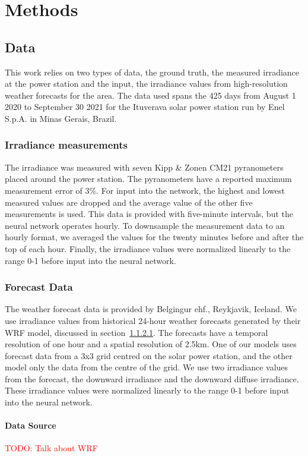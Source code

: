 \chapter{Methods}


\section{Data}
This work relies on two types of data, the ground truth, the measured irradiance at the power station and the input, the irradiance values from high-resolution weather forecasts for the area. The data used spans the 425 days from August 1 2020 to September 30 2021 for the Ituverava solar power station run by Enel S.p.A. in Minas Gerais, Brazil.

\subsection{Irradiance measurements}
The irradiance was measured with seven Kipp \& Zonen CM21 pyranometers placed around the power station. The pyranometers have a reported maximum measurement error of 3\%. For input into the network, the highest and lowest measured values are dropped and the average value of the other five measurements is used. This data is provided with five-minute intervals, but the neural network operates hourly. To downsample the measurement data to an hourly format, we averaged the values for the twenty minutes before and after the top of each hour. Finally, the irradiance values were normalized linearly to the range 0-1 before input into the neural network.
\newpage

\subsection{Forecast Data}
The weather forecast data is provided by Belgingur ehf., Reykjavik, Iceland. We use irradiance values from historical 24-hour weather forecasts generated by their WRF model, discussed in section~\ref{cha:WRF}. The forecasts have a temporal resolution of one hour and a spatial resolution of 2.5km. One of our models uses forecast data from a 3x3 grid centred on the solar power station, and the other model only the data from the centre of the grid. We use two irradiance values from the forecast, the downward irradiance and the downward diffuse irradiance. These irradiance values were normalized linearly to the range 0-1 before input into the neural network.


\subsubsection{Data Source}\label{cha:WRF}
\textcolor{red}{TODO: Talk about WRF} \cite{gueymard_global_2008, rognvaldsson_numerical_2013, jimenez_wrf-solar_2016}


